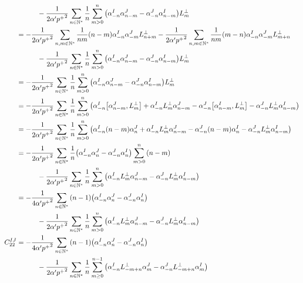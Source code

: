 \begin{align*}
    &\quad\quad\quad-\frac{1}{2\alpha'{p^+}^2}\sum\limits_{n\in\mathbb N^\ast}\frac{1}{n}\sum\limits_{m>0}^n\qty(\alpha_{-n}^I\alpha^J_{n-m}-\alpha_{-n}^J\alpha^I_{n-m})L^\perp_m\\
    &=-\frac{1}{2\alpha'{p^+}^2}\sum\limits_{n,m\in\mathbb N^\ast}\frac{1}{nm}\qty(n-m)\alpha_{-n}^I\alpha^J_{-m}L^\perp_{n+m}-\frac{1}{2\alpha'{p^+}^2}\sum\limits_{n,m\in\mathbb N^\ast}\frac{1}{nm}\qty(m-n)\alpha_{-n}^I\alpha^J_{-m}L^\perp_{m+n}\\
    &\quad\quad\quad-\frac{1}{2\alpha'{p^+}^2}\sum\limits_{n\in\mathbb N^\ast}\frac{1}{n}\sum\limits_{m>0}^n\qty(\alpha_{-n}^I\alpha^J_{n-m}-\alpha_{-n}^J\alpha^I_{n-m})L^\perp_m\\
    &=-\frac{1}{2\alpha'{p^+}^2}\sum\limits_{n\in\mathbb N^\ast}\frac{1}{n}\sum\limits_{m>0}^n\qty(\alpha_{-n}^I\alpha^J_{n-m}-\alpha_{-n}^J\alpha^I_{n-m})L^\perp_m\\
    &=-\frac{1}{2\alpha'{p^+}^2}\sum\limits_{n\in\mathbb N^\ast}\frac{1}{n}\sum\limits_{m>0}^n\qty(\alpha_{-n}^I\comm{\alpha^J_{n-m}}{L^\perp_m}+\alpha_{-n}^IL^\perp_m\alpha^J_{n-m}-\alpha_{-n}^J\comm{\alpha^I_{n-m}}{L^\perp_m}-\alpha_{-n}^JL^\perp_m\alpha^I_{n-m})\\
    &=-\frac{1}{2\alpha'{p^+}^2}\sum\limits_{n\in\mathbb N^\ast}\frac{1}{n}\sum\limits_{m>0}^n\qty(\alpha_{-n}^I\qty(n-m)\alpha^J_{n}+\alpha_{-n}^IL^\perp_m\alpha^J_{n-m}-\alpha_{-n}^J\qty(n-m)\alpha^I_n-\alpha_{-n}^JL^\perp_m\alpha^I_{n-m})\\
    &=-\frac{1}{2\alpha'{p^+}^2}\sum\limits_{n\in\mathbb N^\ast}\frac{1}{n}\qty(\alpha_{-n}^I\alpha^J_{n}-\alpha_{-n}^J\alpha^I_n)\sum\limits_{m>0}^n\qty(n-m)\\
    &\quad\quad\quad-\frac{1}{2\alpha'{p^+}^2}\sum\limits_{n\in\mathbb N^\ast}\frac{1}{n}\sum\limits_{m>0}^n\qty(\alpha_{-n}^IL^\perp_m\alpha^J_{n-m}-\alpha_{-n}^JL^\perp_m\alpha^I_{n-m})\\
    &=-\frac{1}{4\alpha'{p^+}^2}\sum\limits_{n\in\mathbb N^\ast}\qty(n-1)\qty(\alpha_{-n}^I\alpha^J_{n}-\alpha_{-n}^J\alpha^I_n)\\
    &\quad\quad\quad-\frac{1}{2\alpha'{p^+}^2}\sum\limits_{n\in\mathbb N^\ast}\frac{1}{n}\sum\limits_{m>0}^n\qty(\alpha_{-n}^IL^\perp_m\alpha^J_{n-m}-\alpha_{-n}^JL^\perp_m\alpha^I_{n-m})\\
    C_{22}^{IJ}&=-\frac{1}{4\alpha'{p^+}^2}\sum\limits_{n\in\mathbb N^\ast}\qty(n-1)\qty(\alpha_{-n}^I\alpha^J_{n}-\alpha_{-n}^J\alpha^I_n)\\
    &\quad\quad\quad-\frac{1}{2\alpha'{p^+}^2}\sum\limits_{n\in\mathbb N^\ast}\frac{1}{n}\sum\limits_{m\geq0}^{n-1}\qty(\alpha_{-n}^IL^\perp_{-m+n}\alpha^J_{m}-\alpha_{-n}^JL^\perp_{-m+n}\alpha^I_{m})
\end{align*}

